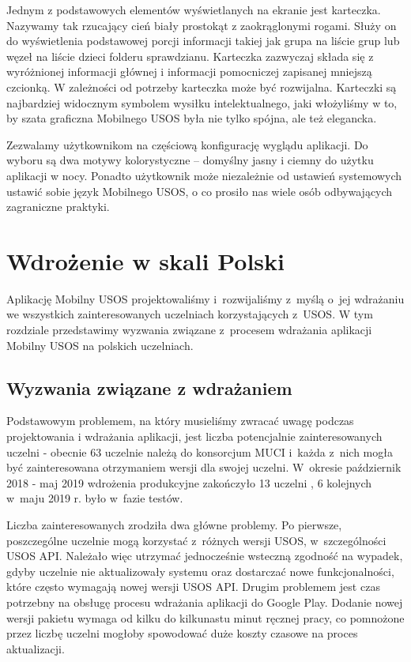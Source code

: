 \documentclass{pracamgr}
\begin{document}
Jednym z podstawowych elementów wyświetlanych na ekranie jest karteczka. Nazywamy
tak rzucający cień biały prostokąt z zaokrąglonymi rogami. Służy on do wyświetlenia
podstawowej porcji informacji takiej jak grupa na liście grup lub węzeł na liście
dzieci folderu sprawdzianu. Karteczka zazwyczaj składa się z wyróżnionej informacji
głównej i informacji pomocniczej zapisanej mniejszą czcionką. W zależności od potrzeby
karteczka może być rozwijalna. Karteczki są najbardziej widocznym symbolem wysiłku
intelektualnego, jaki włożyliśmy w to, by szata graficzna Mobilnego USOS była nie
tylko spójna, ale też elegancka.

Zezwalamy użytkownikom na częściową konfigurację wyglądu aplikacji. Do wyboru są
dwa motywy kolorystyczne -- domyślny jasny i ciemny do użytku aplikacji w nocy.
Ponadto użytkownik może niezależnie od ustawień systemowych ustawić sobie język
Mobilnego USOS, o co prosiło nas wiele osób odbywających zagraniczne praktyki.

\chapter{Wdrożenie w skali Polski}

Aplikację Mobilny USOS projektowaliśmy i~rozwijaliśmy z~myślą o~jej wdrażaniu we wszystkich zainteresowanych uczelniach
korzystających z~USOS. W tym rozdziale przedstawimy wyzwania związane z~procesem wdrażania aplikacji Mobilny USOS na
polskich uczelniach.

\section{Wyzwania związane z wdrażaniem}

Podstawowym problemem, na który musieliśmy zwracać uwagę podczas projektowania i wdrażania aplikacji, jest liczba
potencjalnie zainteresowanych uczelni - obecnie 63 uczelnie należą do konsorcjum MUCI \cite{uczelnie-w-muci} i~każda
z~nich mogła być zainteresowana otrzymaniem wersji dla swojej uczelni. W~okresie październik 2018 - maj 2019 wdrożenia
produkcyjne zakończyło 13 uczelni \cite{news-musosumk}, 6 kolejnych w~maju 2019 r. było w~fazie testów.

Liczba zainteresowanych zrodziła dwa główne problemy. Po pierwsze, poszczególne uczelnie mogą korzystać z~różnych
wersji USOS, w~szczególności USOS API. Należało więc utrzymać jednocześnie wsteczną zgodność na wypadek, gdyby uczelnie
nie aktualizowały systemu oraz dostarczać nowe funkcjonalności, które często wymagają nowej wersji USOS API. Drugim
problemem jest czas potrzebny na obsługę procesu wdrażania aplikacji do Google Play. Dodanie nowej wersji pakietu
wymaga od kilku do kilkunastu minut ręcznej pracy, co pomnożone przez liczbę uczelni mogłoby spowodować duże koszty
czasowe na proces aktualizacji.
\end{document}
